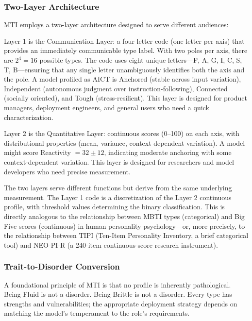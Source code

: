 \documentclass[11pt]{article}
\begin{document}
\subsubsection{Two-Layer Architecture}

MTI employs a two-layer architecture designed to serve different audiences:

Layer 1 is the Communication Layer: a four-letter code (one letter per axis) that provides an immediately communicable type label. With two poles per axis, there are $2^4 = 16$ possible types. The code uses eight unique letters---F, A, G, I, C, S, T, B---ensuring that any single letter unambiguously identifies both the axis and the pole. A model profiled as AICT is Anchored (stable across input variation), Independent (autonomous judgment over instruction-following), Connected (socially oriented), and Tough (stress-resilient). This layer is designed for product managers, deployment engineers, and general users who need a quick characterization.

Layer 2 is the Quantitative Layer: continuous scores (0--100) on each axis, with distributional properties (mean, variance, context-dependent variation). A model might score Reactivity $= 32 \pm 12$, indicating moderate anchoring with some context-dependent variation. This layer is designed for researchers and model developers who need precise measurement.

The two layers serve different functions but derive from the same underlying measurement. The Layer 1 code is a discretization of the Layer 2 continuous profile, with threshold values determining the binary classification. This is directly analogous to the relationship between MBTI types (categorical) and Big Five scores (continuous) in human personality psychology---or, more precisely, to the relationship between TIPI (Ten-Item Personality Inventory, a brief categorical tool) and NEO-PI-R (a 240-item continuous-score research instrument).

\subsubsection{Trait-to-Disorder Conversion}

A foundational principle of MTI is that no profile is inherently pathological. Being Fluid is not a disorder. Being Brittle is not a disorder. Every type has strengths and vulnerabilities; the appropriate deployment strategy depends on matching the model's temperament to the role's requirements.
\end{document}
